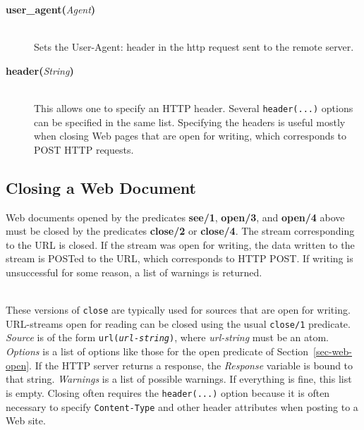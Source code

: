 \begin{description}
\begin{description}
  \item[{\bf user\_agent}{\bf (}{\it Agent}{\bf )}]\mbox{}\\Sets the User-Agent: header in the http request sent to the remote server.

  \item[{\bf header}{\bf (}{\it String}{\bf )}]\mbox{}\\This allows one
    to specify an HTTP header. Several \texttt{header(...)} options can be
    specified in the same list. Specifying the headers is useful mostly
    when closing
    Web pages that are open for writing, which corresponds to POST HTTP
    requests.

  \end{description}


\end{description}

\subsection{Closing a Web Document}

Web documents opened by the predicates {\bf see/1}, {\bf open/3}, and {\bf
  open/4} above must be closed by the predicates {\bf close/2} or {\bf
  close/4}. The stream corresponding to the URL is closed. If the stream
was open for writing, the data written to the stream is POSTed
to the URL, which corresponds to HTTP POST.
If writing is unsuccessful for some reason,
a list of warnings is returned.

\begin{description}

\item[close({\it +Source, +Options})]\mbox{}
\item[close({\it +Source, +Options, -Response, -Warnings})]\mbox{}
  \\
These versions of \texttt{close} are typically used for sources that
are open for writing. URL-streams open for reading can be closed using the
usual \texttt{close/1} predicate. 
{\it Source} is of the form {\tt url({\it {url-string}})},
where \emph{url-string} must be an atom. {\it Options} is a list
of options like those for the open predicate of Section~\ref{sec-web-open}.
If the HTTP server returns a response, the \emph{Response} variable is
bound to that string. \emph{Warnings} is a list of possible warnings. If
everything is fine, this list is empty.  
Closing often requires the \texttt{header(...)} option because it
is often necessary to specify \texttt{Content-Type} and other header
attributes when posting to a Web site. 

\end{description}


